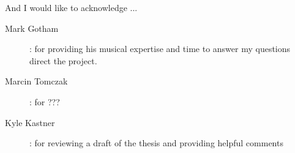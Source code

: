 
\begin{acknowledgements}


And I would like to acknowledge ...

\begin{description}
  \item[Mark Gotham]: for providing his musical expertise and time to answer my questions
    direct the project.
  \item[Marcin Tomczak]: for ???
  \item[Kyle Kastner]: for reviewing a draft of the thesis and providing helpful comments
\end{description}


\end{acknowledgements}
